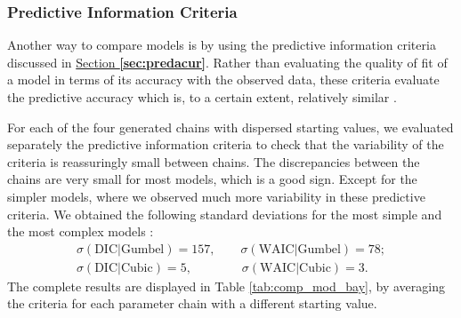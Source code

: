  \subsubsection*{Predictive Information Criteria}
 
 
 Another way to compare models is by using the predictive information criteria discussed in \hyperref[sec:predacur]{Section \textbf{\ref{sec:predacur}}}. Rather than evaluating the quality of fit of a model in terms of its accuracy with the observed data, these criteria evaluate the predictive accuracy
 which is, to a certain extent, relatively similar . 
  
 
 For each of the four generated chains with dispersed starting values, we evaluated separately the predictive information criteria  to check that the variability of the criteria is reassuringly small between chains. The discrepancies between the chains are very small for most models, which is a good sign. Except for the simpler models, where we observed much more variability in these predictive criteria. We obtained the following standard deviations for the most simple and the most complex models :
 \begin{equation*}
 \begin{aligned}
\sigma(\text{DIC}|\text{Gumbel}) = 157, \qquad \sigma(\text{WAIC}|\text{Gumbel}) = 78; \\ 
\sigma(\text{DIC}|\text{Cubic}) = 5, \qquad \qquad 
\sigma(\text{WAIC}|\text{Cubic}) = 3. \quad
\end{aligned} 
 \end{equation*}
The complete results are displayed in Table \ref{tab:comp_mod_bay}, by averaging the criteria for each parameter chain with a different starting value. 

